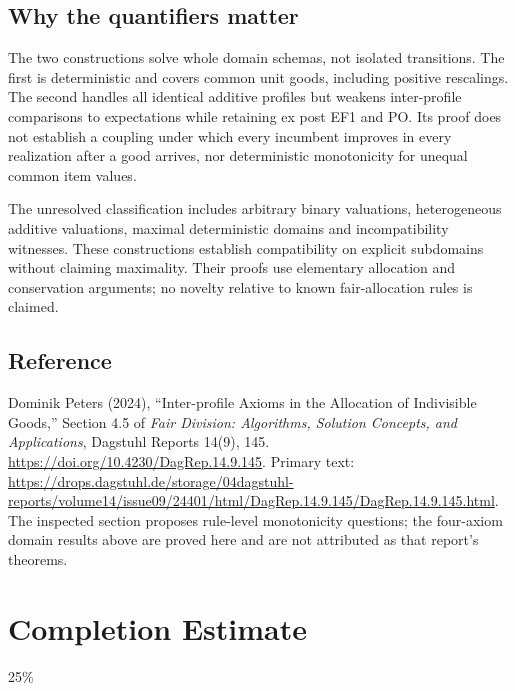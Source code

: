 \documentclass[11pt,a4paper]{article}
\begin{document}
\subsection*{Why the quantifiers matter}
The two constructions solve whole domain schemas, not isolated transitions. The first is deterministic and covers common unit goods, including positive rescalings. The second handles all identical additive profiles but weakens inter-profile comparisons to expectations while retaining ex post EF1 and PO. Its proof does not establish a coupling under which every incumbent improves in every realization after a good arrives, nor deterministic monotonicity for unequal common item values.

The unresolved classification includes arbitrary binary valuations, heterogeneous additive valuations, maximal deterministic domains and incompatibility witnesses. These constructions establish compatibility on explicit subdomains without claiming maximality. Their proofs use elementary allocation and conservation arguments; no novelty relative to known fair-allocation rules is claimed.

\subsection*{Reference}
Dominik Peters (2024), ``Inter-profile Axioms in the Allocation of Indivisible Goods,'' Section 4.5 of \emph{Fair Division: Algorithms, Solution Concepts, and Applications}, Dagstuhl Reports 14(9), 145. \url{https://doi.org/10.4230/DagRep.14.9.145}. Primary text: \url{https://drops.dagstuhl.de/storage/04dagstuhl-reports/volume14/issue09/24401/html/DagRep.14.9.145/DagRep.14.9.145.html}. The inspected section proposes rule-level monotonicity questions; the four-axiom domain results above are proved here and are not attributed as that report's theorems.

\section{Completion Estimate}
25\%
\end{document}

